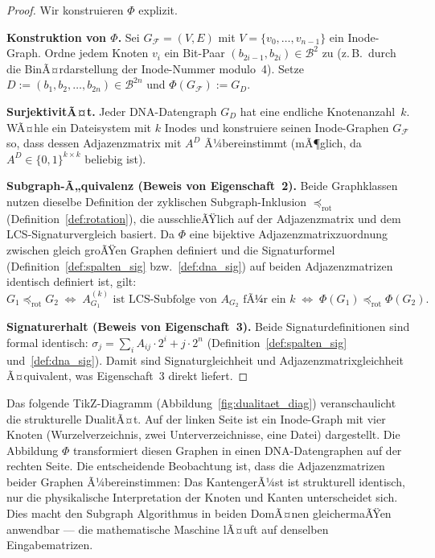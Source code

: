 ﻿\documentclass[a4paper,12pt]{article}
\theoremstyle{definition}
\theoremstyle{plain}
\begin{document}
\begin{proof}
  Wir konstruieren $\Phi$ explizit.
  
  \textbf{Konstruktion von $\Phi$.}
  Sei $G_\mathcal{F} = (V, E)$ mit $V = \{v_0, \ldots, v_{n-1}\}$
  ein Inode-Graph.  Ordne jedem Knoten $v_i$ ein Bit-Paar
  $(b_{2i-1}, b_{2i}) \in \mathcal{B}^2$ zu (z.\,B.\ durch die
  BinÃ¤rdarstellung der Inode-Nummer modulo~4).
  Setze $D := (b_1, b_2, \ldots, b_{2n}) \in \mathcal{B}^{2n}$ und
  $\Phi(G_\mathcal{F}) := G_D$.
  
  \textbf{SurjektivitÃ¤t.}
  Jeder DNA-Datengraph $G_D$ hat eine endliche Knotenanzahl~$k$.
  WÃ¤hle ein Dateisystem mit $k$ Inodes und konstruiere seinen Inode-Graphen
  $G_\mathcal{F}$ so, dass dessen Adjazenzmatrix mit $A^D$ Ã¼bereinstimmt
  (mÃ¶glich, da $A^D \in \{0,1\}^{k \times k}$ beliebig ist).
  
  \textbf{Subgraph-Ã„quivalenz (Beweis von Eigenschaft~2).}
  Beide Graphklassen nutzen dieselbe Definition der zyklischen Subgraph-Inklusion
  $\preceq_{\mathrm{rot}}$ (Definition~\ref{def:rotation}), die ausschlieÃŸlich
  auf der Adjazenzmatrix und dem LCS-Signaturvergleich basiert.
  Da $\Phi$ eine bijektive Adjazenzmatrixzuordnung zwischen gleich groÃŸen
  Graphen definiert und die Signaturformel (Definition~\ref{def:spalten_sig}
  bzw.~\ref{def:dna_sig}) auf beiden Adjazenzmatrizen identisch definiert ist,
  gilt:
  \[
    G_1 \preceq_{\mathrm{rot}} G_2
    \;\Longleftrightarrow\;
    A_{G_1}^{(k)} \text{ ist LCS-Subfolge von } A_{G_2}
    \text{ fÃ¼r ein } k
    \;\Longleftrightarrow\;
    \Phi(G_1) \preceq_{\mathrm{rot}} \Phi(G_2).
  \]
  
  \textbf{Signaturerhalt (Beweis von Eigenschaft~3).}
  Beide Signaturdefinitionen sind formal identisch:
  $\sigma_j = \sum_i A_{ij} \cdot 2^i + j \cdot 2^n$
  (Definition~\ref{def:spalten_sig} und~\ref{def:dna_sig}).
  Damit sind Signaturgleichheit und Adjazenzmatrixgleichheit Ã¤quivalent,
  was Eigenschaft~3 direkt liefert. 
\end{proof}

Das folgende TikZ-Diagramm (Abbildung~\ref{fig:dualitaet_diag}) veranschaulicht
die strukturelle DualitÃ¤t.  Auf der linken Seite ist ein Inode-Graph mit
vier Knoten (Wurzelverzeichnis, zwei Unterverzeichnisse, eine Datei) dargestellt.
Die Abbildung $\Phi$ transformiert diesen Graphen in einen DNA-Datengraphen
auf der rechten Seite.  Die entscheidende Beobachtung ist, dass die
Adjazenzmatrizen beider Graphen Ã¼bereinstimmen: Das KantengerÃ¼st ist
strukturell identisch, nur die physikalische Interpretation der Knoten
und Kanten unterscheidet sich.  Dies macht den Subgraph Algorithmus in beiden
DomÃ¤nen gleichermaÃŸen anwendbar --- die mathematische Maschine lÃ¤uft auf
denselben Eingabematrizen.
\end{document}
